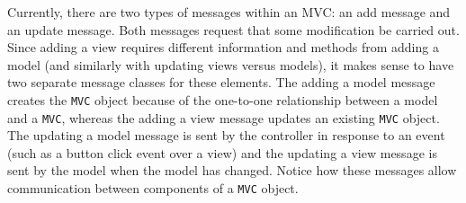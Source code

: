 \documentclass{article}[11pt]
\newcommand{\Robject}[1]{{\texttt{#1}}}
\begin{document}
Currently, there are two types of messages within an MVC: an add
message and an update message.  Both messages request that some
modification be carried out.  Since adding a view requires different
information and methods from adding a model (and similarly with
updating views versus models), it makes sense to have two separate
message classes for these elements.  The adding a model message creates the
\Robject{MVC} object because of the one-to-one relationship between a model
and a \Robject{MVC}, whereas the adding a view message updates an
existing \Robject{MVC} object.  The updating a model message is sent by the
controller in response to an event (such as a button click event over a view)
and the updating a view message is sent by the model when the model has
changed.  Notice how these messages allow communication between components
of a \Robject{MVC} object.
\end{document}
